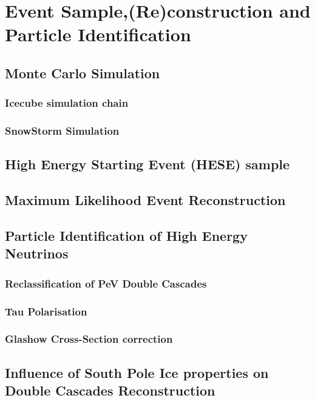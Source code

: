\setchapterpreamble[u]{\margintoc}
\chapter{Event Sample,(Re)construction and Particle Identification}

\section{Monte Carlo Simulation} 
\label{sec:mc_sim}

\subsection{Icecube simulation chain}
\label{sec:sim_ic}

\subsection{SnowStorm Simulation}
\label{sec:snowstorm}

\section{High Energy Starting Event (HESE) sample} 
\label{sec:HESE}

\section{Maximum Likelihood Event Reconstruction}
\label{sec:reco}

\section{Particle Identification of High Energy Neutrinos}
\label{sec:PID}

\subsection{Reclassification of PeV Double Cascades}
\label{sec:Pev_mask}

\subsection{Tau Polarisation}
\label{sec:tau_polarisation}

\subsection{Glashow Cross-Section correction}
\label{sec:glashow_correction}



\section{Influence of South Pole Ice properties on Double Cascades Reconstruction}
\label{sec:icemodel_checks}
